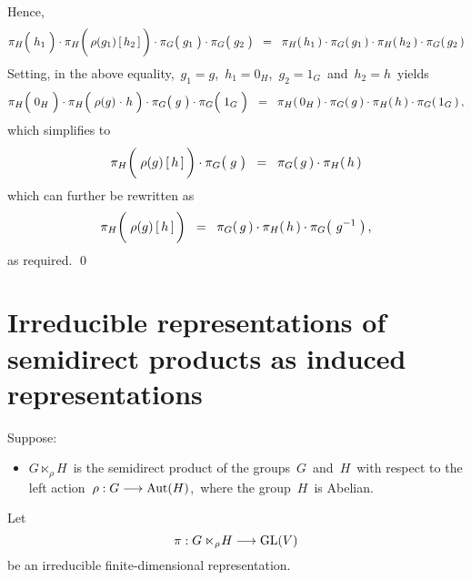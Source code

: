 \begin{enumerate}
\begin{eqnarray*}
	\end{eqnarray*}
	Hence,
	\begin{equation*}
		\pi_{H}\!\left(\;\overset{{\color{white}.}}{h_{1}}\;\right)
		\cdot
		\pi_{H}\!\left(\,\overset{{\color{white}1}}{\rho(g_{1})}\,[\,h_{2}\,]\,\right)
		\cdot
		\pi_{G}\!\left(\;\overset{{\color{white}.}}{g_{1}}\;\right)
		\cdot
		\pi_{G}\!\left(\;\overset{{\color{white}.}}{g_{2}}\;\right)
	\;\; = \;\;
		\pi_{H}(\,h_{1}\,) \cdot \pi_{G}(\,g_{1}\,)
		\cdot
		\pi_{H}(\,h_{2}\,) \cdot \pi_{G}(\,g_{2}\,)
	\end{equation*}
	Setting, in the above equality,
	\,$g_{1} = g$,\,  $h_{1} = 0_{H}$,\, $g_{2} = 1_{G}$\, and \,$h_{2} = h$\,
	yields
	\begin{equation*}
		\pi_{H}\!\left(\;\overset{{\color{white}.}}{0_{H}}\;\right)
		\cdot
		\pi_{H}\!\left(\;\rho(g) \overset{{\color{white}1}}{\cdot} h\;\right)
		\cdot
		\pi_{G}\!\left(\;\overset{{\color{white}.}}{g}\;\right)
		\cdot
		\pi_{G}\!\left(\;\overset{{\color{white}.}}{1_{G}}\;\right)
	\;\; = \;\;
		\pi_{H}(\,0_{H}\,) \cdot \pi_{G}(\,g\,)
		\cdot
		\pi_{H}(\,h\,) \cdot \pi_{G}(\,1_{G}\,)\,,
	\end{equation*}
	which simplifies to
	\begin{equation*}
		\pi_{H}\!\left(\;\overset{{\color{white}1}}{\rho(g)}\,[\,h\,]\,\right)
		\cdot
		\pi_{G}\!\left(\;\overset{{\color{white}.}}{g}\;\right)
	\;\; = \;\;
		\pi_{G}(\,g\,)
		\cdot
		\pi_{H}(\,h\,)
	\end{equation*}
	which can further be rewritten as
	\begin{equation*}
		\pi_{H}\!\left(\;\overset{{\color{white}-}}{\rho(g)}\,[\,h\,]\,\right)
	\;\; = \;\;
		\pi_{G}(\,g\,)
		\cdot
		\pi_{H}(\,h\,)
		\cdot
		\pi_{G}\!\left(\,\overset{{\color{white}.}}{{\color{white}g}}\!\!g^{-1}\;\right),
	\end{equation*}
	as required. \qed
\end{enumerate}


\vskip 1.0cm
\section{Irreducible representations of semidirect products as induced representations}


\begin{theorem}
\mbox{}
\vskip 0.1cm
\noindent
Suppose:
\begin{itemize}
\item
	$G \ltimes_{\rho}\! H$\, is the semidirect product of the groups \,$G$\, and \,$H$\,
	with respect to the left action
	\,$\rho : G \longrightarrow \textnormal{Aut}(H)$,\,
	where the group \,$H$\, is Abelian.
\end{itemize}
Let
\begin{equation*}
\pi : G \ltimes_{\rho}\! H \longrightarrow \textnormal{GL}(V)
\end{equation*}
be an irreducible finite-dimensional representation.
\end{theorem}

